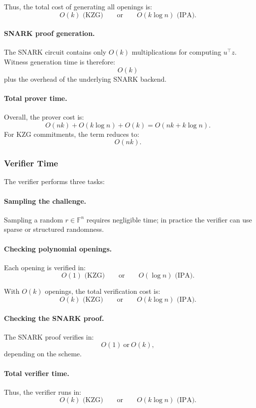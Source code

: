 \documentclass[11pt]{article}
\begin{document}
Thus, the total cost of generating all openings is:
\[
  O(k) \text{ (KZG)} 
  \qquad\text{or}\qquad 
  O(k \log n) \text{ (IPA)}.
\]

\paragraph{SNARK proof generation.}
The SNARK circuit contains only $O(k)$ multiplications for computing
$u^\top z$.
Witness generation time is therefore:
\[
  O(k)
\]
plus the overhead of the underlying SNARK backend.

\paragraph{Total prover time.}
Overall, the prover cost is:
\[
  O(nk) + O(k \log n) + O(k) 
  = O(nk + k \log n).
\]
For KZG commitments, the term reduces to:
\[
  O(nk).
\]

\subsubsection{Verifier Time}

The verifier performs three tasks:

\paragraph{Sampling the challenge.}
Sampling a random $r \in \mathbb{F}^n$ requires negligible time;  
in practice the verifier can use sparse or structured randomness.

\paragraph{Checking polynomial openings.}
Each opening is verified in:
\[
  O(1) \text{ (KZG)} 
  \qquad\text{or}\qquad 
  O(\log n) \text{ (IPA)}.
\]

With $O(k)$ openings, the total verification cost is:
\[
  O(k) \text{ (KZG)} 
  \qquad\text{or}\qquad 
  O(k \log n) \text{ (IPA)}.
\]

\paragraph{Checking the SNARK proof.}
The SNARK proof verifies in:
\[
  O(1) \ \text{or}\ O(k),
\]
depending on the scheme.

\paragraph{Total verifier time.}
Thus, the verifier runs in:
\[
  O(k) \text{ (KZG)} 
  \qquad\text{or}\qquad 
  O(k \log n) \text{ (IPA)}.
\]
\end{document}

